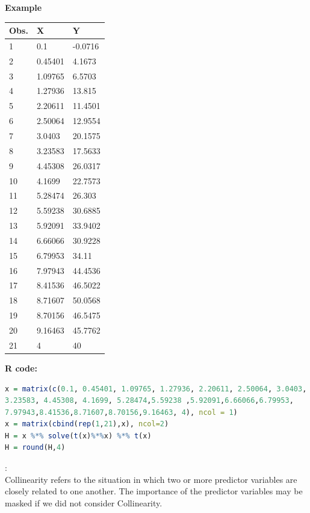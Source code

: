     \documentclass[12pt,fleqn,a4paper]{article}%
\theoremstyle{definition}
\theoremstyle{plain}
\numberwithin{equation}{section}
\begin{document}
\begin{framed}
\textbf{Example}\\

\begin{tabular}{lll}
Obs. & X  & Y   \\
\hline
1& 0.1& -0.0716\\
2& 0.45401& 4.1673\\
3& 1.09765& 6.5703\\
4& 1.27936& 13.815\\
5& 2.20611& 11.4501\\
6& 2.50064& 12.9554\\
7& 3.0403& 20.1575\\
8& 3.23583& 17.5633\\
9& 4.45308& 26.0317\\
10& 4.1699& 22.7573\\
11& 5.28474& 26.303\\
12& 5.59238& 30.6885\\
13& 5.92091& 33.9402\\
14& 6.66066& 30.9228\\
15& 6.79953& 34.11\\
16& 7.97943& 44.4536\\
17& 8.41536& 46.5022\\
18& 8.71607& 50.0568\\
19& 8.70156& 46.5475\\
20& 9.16463& 45.7762\\
21& 4& 40\\
\bottomrule
\end{tabular}


\textbf{R code:}
\footnotesize
\begin{lstlisting}[language=R]
x = matrix(c(0.1, 0.45401, 1.09765, 1.27936, 2.20611, 2.50064, 3.0403, 
3.23583, 4.45308, 4.1699, 5.28474,5.59238 ,5.92091,6.66066,6.79953,
7.97943,8.41536,8.71607,8.70156,9.16463, 4), ncol = 1)
x = matrix(cbind(rep(1,21),x), ncol=2)
H = x %*% solve(t(x)%*%x) %*% t(x)
H = round(H,4)
\end{lstlisting}
\end{framed}
\textbf{\color{blue}{6. Collinearity}}:\\
Collinearity refers to the situation in which two or more predictor variables are closely related to one another. 
The importance of the predictor variables may be masked if we did not consider Collinearity. 
\end{document}
